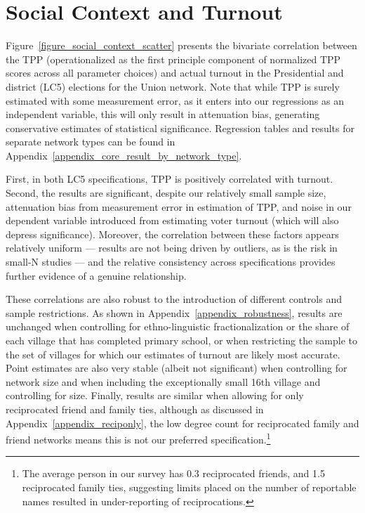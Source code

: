 \documentclass[12pt]{article}
\begin{document}
\section{Social Context and Turnout}\label{section_results}

Figure~\ref{figure_social_context_scatter} presents the bivariate correlation between the TPP (operationalized as the first principle component of normalized TPP scores across all parameter choices) and actual turnout in the Presidential and district (LC5) elections for the Union network. Note that while TPP is surely estimated with some measurement error, as it enters into our regressions as an independent variable, this will only result in attenuation bias, generating conservative estimates of statistical significance. Regression tables and results for separate network types can be found in Appendix~\ref{appendix_core_result_by_network_type}.

First, in both LC5 specifications, TPP is positively correlated with turnout. Second, the results are significant, despite our relatively small sample size, attenuation bias from measurement error in estimation of TPP, and noise in our dependent variable introduced from estimating voter turnout (which will also depress significance). Moreover, the correlation between these factors appears relatively uniform --- results are not being driven by outliers, as is the risk in small-N studies --- and the relative consistency across specifications provides further evidence of a genuine relationship.

These correlations are also robust to the introduction of different controls and sample restrictions. As shown in Appendix~\ref{appendix_robustness}, results are unchanged when controlling for ethno-linguistic fractionalization or the share of each village that has completed primary school, or when restricting the sample to the set of villages for which our estimates of turnout are likely most accurate. Point estimates are also very stable (albeit not significant) when controlling for network size and when including the exceptionally small 16th village and controlling for size. Finally, results are similar when allowing for only reciprocated friend and family ties, although as discussed in Appendix~\ref{appendix_reciponly}, the low degree count for reciprocated family and friend networks means this is not our preferred specification.\footnote{The average person in our survey has 0.3 reciprocated friends, and 1.5 reciprocated family ties, suggesting limits placed on the number of reportable names resulted in under-reporting of reciprocations.}
\end{document}
